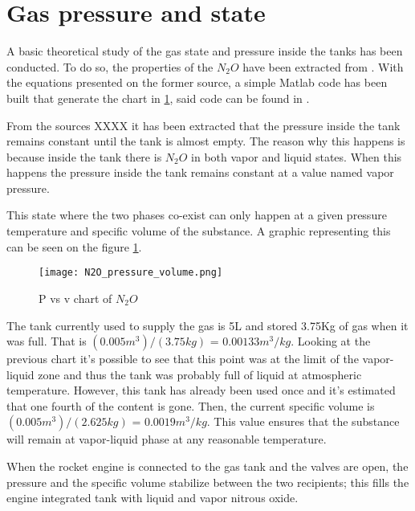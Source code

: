 
\section*{Gas pressure and state}

A basic theoretical study of the gas state and pressure inside the tanks has been conducted. To do so, the properties of the $N_2O$ have been extracted from \cite{n2oReference}. With the equations presented on the former source, a simple Matlab code has been built that generate the chart in \ref{fig:N2O_P_V_graph}, said code can be found in \cite{MatlabPVchart}.

From the sources XXXX it has been extracted that the pressure inside the tank remains constant until the tank is almost empty. The reason why this happens is because inside the tank there is $N_2O$ in both vapor and liquid states. When this happens the pressure inside the tank remains constant at a value named vapor pressure.

This state where the two phases co-exist can only happen at a given pressure temperature and specific volume of the substance. A graphic representing this can be seen on the figure \ref{fig:N2O_P_V_graph}.

\begin{figure}[h]
  \centering
  \texttt{[image: N2O\_pressure\_volume.png]}
  \caption{P vs v chart of $N_2O$}
  \label{fig:N2O_P_V_graph}
\end{figure}

The tank currently used to supply the gas is 5L and stored 3.75Kg of gas when it was full. That is $(0.005 m^3) / (3.75 kg)$ = $0.00133 m^3/kg$. Looking at the previous chart it's possible to see that this point was at the limit of the vapor-liquid zone and thus the tank was probably full of liquid at atmospheric temperature. However, this tank has already been used once and it's estimated that one fourth of the content is gone. Then, the current specific volume is $(0.005 m^3) / (2.625 kg)$ = $0.0019 m^3/kg$. This value ensures that the substance will remain at vapor-liquid phase at any reasonable temperature.

When the rocket engine is connected to the gas tank and the valves are open, the pressure and the specific volume stabilize between the two recipients; this fills the engine integrated tank with liquid and vapor nitrous oxide.
